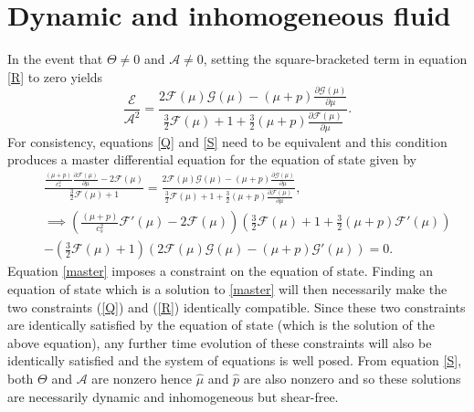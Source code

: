 \documentclass[abstract=on,notitlepage,superscriptaddress,nofootinbib,aps,preprint,prd]{revtex4}
\newcommand{\0}{^{(0)}}
\newcommand{\1}{^{(1)}}
\newcommand{\2}{^{(2)}}
\newcommand{\3}{{}^{(3)}}
\begin{document}
\section{Dynamic and inhomogeneous fluid}
In the event that $\Theta \neq 0$ and $\mathcal{A} \neq 0$,  setting the square-bracketed term in equation \eqref{R} to zero yields
\begin{equation}
	\frac{\mathcal{E}}{\mathcal{A}^2}=\frac{2\mathcal{F}(\mu)\mathcal{G}(\mu)-(\mu+p)\frac{\partial \mathcal{G}(\mu)}{\partial \mu}}{\frac{3}{2}\mathcal{F}(\mu)+1+\frac{3}{2}(\mu+p)\frac{\partial \mathcal{F}(\mu)}{\partial \mu}}. \label{S}
\end{equation}
 For consistency, equations \eqref{Q} and \eqref{S} need to be equivalent and this condition produces a master differential equation for the equation of state given by
\begin{eqnarray}
&&	\frac{\frac{(\mu+p)}{c_s^2}\frac{\partial \mathcal{F}(\mu)}{\partial \mu}-2\mathcal{F}(\mu)}{\frac{3}{2}\mathcal{F}(\mu)+1} = \frac{2\mathcal{F}(\mu)\mathcal{G}(\mu)-(\mu+p)\frac{\partial \mathcal{G}(\mu)}{\partial \mu}}{\frac{3}{2}\mathcal{F}(\mu)+1+\frac{3}{2}(\mu+p)\frac{\partial \mathcal{F}(\mu)}{\partial \mu}}, \nonumber \\
\label{master}
	&& \implies \left(\frac{(\mu+p)}{c_s^2}\mathcal{F}'(\mu)-2\mathcal{F}(\mu)\right)\left(\frac{3}{2}\mathcal{F}(\mu)+1+\frac{3}{2}(\mu+p)\mathcal{F}'(\mu)\right)\nonumber\\
	&&-\left(\frac{3}{2}\mathcal{F}(\mu)+1\right)\left(2\mathcal{F}(\mu)\mathcal{G}(\mu)-(\mu+p)\mathcal{G}'(\mu)\right) =0.
\end{eqnarray}
Equation \eqref{master} imposes a constraint on the equation of state. Finding an equation of state which is a solution to \eqref{master} will then necessarily make the two constraints (\ref{Q}) and (\ref{R}) identically compatible. Since these two constraints are identically satisfied by the equation of state (which is the solution of the above equation), any further time evolution of these constraints will also be identically satisfied and the system of equations is well posed. From equation \eqref{S}, both $\Theta$ and $\mathcal{A}$ are nonzero hence $\hat{\mu}$ and $\hat{p}$ are also nonzero and so these solutions are necessarily dynamic and inhomogeneous but shear-free.
\end{document}
